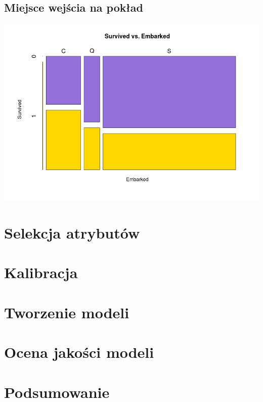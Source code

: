 \documentclass{article}
\begin{document}
\subsection{Miejsce wejścia na pokład }

\includegraphics[scale=0.40]{images/survived-vs-embarked.png}

\section{Selekcja atrybutów}
\section{Kalibracja}
\section{Tworzenie modeli}
\section{Ocena jakości modeli}
\section{Podsumowanie}
\end{document}
